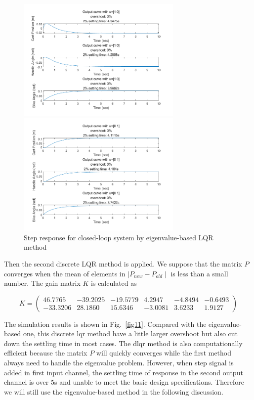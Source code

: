 \documentclass[hyperref]{article}
\theoremstyle{nonumberplain}
\begin{document}
	\begin{figure}[htbp]
		\centering
		\begin{minipage}[t]{0.48\textwidth}
			\centering
			\includegraphics[width=8cm]{fig12.png}
		\end{minipage}
		\begin{minipage}[t]{0.48\textwidth}
			\centering
			\includegraphics[width=8cm]{fig13.png}
		\end{minipage}
		\caption{Step response for closed-loop system by eigenvalue-based LQR method}
		\label{fig10}
	\end{figure}
	
	Then the second discrete LQR method is applied. We suppose that the matrix $P$ converges when the mean of elements in $\mid P_{new}-P_{old} \mid$ is less than a small number. The gain matrix $K$ is calculated as
	
	\begin{equation}
	K=\begin{pmatrix}
	46.7765 &-39.2025  &-19.5779  &4.2947  &-4.8494  &-0.6493 \\ 
	-33.3206 &28.1860  &15.6346  &-3.0081  &3.6233  &1.9127 
	\end{pmatrix}
	\nonumber
	\end{equation}
	
	The simulation results is shown in Fig.~\ref{fig11}. Compared with the eigenvalue-based one, this discrete lqr method have a little larger overshoot but also cut down the settling time in most cases. The dlqr method is also computationally efficient because the matrix $P$ will quickly converges while the first method always need to handle the eigenvalue problem. However, when step signal is added in first input channel, the settling time of response in the second output channel is over 5s and unable to meet the basic design specifications. Therefore we will still use the eigenvalue-based method in the following discussion.
	
\end{document}
